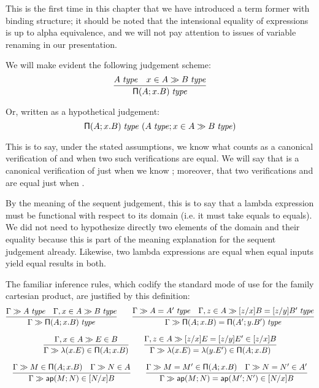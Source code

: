\documentclass[main.tex]{subfiles}
\begin{document}
This is the first time in this chapter that we have introduced a term former
with binding structure; it should be noted that the intensional equality of
expressions is up to alpha equivalence, and we will not pay attention to issues
of variable renaming in our presentation.

We will make evident the following judgement scheme:
\[
  \infer{
    \isset{\typrod{A}{x}{B}}
  }{
    \isset{A} &
    \sequent{\ver{x}{A}}{\isset{B}}
  }
\]

Or, written as a hypothetical judgement:
\[
  \mathsf{\Pi}(A;x.B)\;\mathit{type}\ (A\;\mathit{type};x\in A\gg B\;\mathit{type})
\]

This is to say, under the stated assumptions, we know what counts as a
canonical verification of  and when two such verifications are
equal. We will say that  is a canonical verification of
 just when we know ; moreover,
that two verifications  and  are equal just when
.

By the meaning of the sequent judgement, this is to say that a lambda
expression must be functional with respect to its domain (i.e. it must take
equals to equals). We did not need to hypothesize directly two elements of the
domain and their equality because this is part of the meaning explanation for
the sequent judgement already. Likewise, two lambda expressions are equal when
equal inputs yield equal results in both.

The familiar inference rules, which codify the standard mode of use for the
family cartesian product, are justified by this definition:
\begin{gather*}
  \infer{
    \sequent\Gamma\isset{\typrod{A}{x}{B}}
  }{
    \sequent\Gamma\isset{A} &
    \sequent{\Gamma,\ver{x}{A}}{\isset{B}}
  }\qquad
  \infer{
    \sequent\Gamma\isset{\typrod{A}{x}{B}=\typrod{A'}{y}{B'}}
  }{
   \sequent\Gamma\isset{A=A'} &
    \sequent{\Gamma,\ver{z}{A}}{\isset{[z/x]B=[z/y]B'}}
  }\\[6pt]
  \infer{
    \sequent\Gamma\ver{\lam{x}{E}}{\typrod{A}{x}{B}}
  }{
    \sequent{\Gamma,\ver{x}{A}}{\ver{E}{B}}
  }\qquad
  \infer{
    \sequent\Gamma\ver{\lam{x}{E}=\lam{y}{E'}}{\typrod{A}{x}{B}}
  }{
    \sequent{\Gamma,\ver{z}{A}}{\ver{[z/x]E=[z/y]E'}{[z/x]B}}
  }\\[6pt]
  \infer{
    \sequent\Gamma\ver{\ap{M}{N}}{[N/x]B}
  }{
    \sequent\Gamma\ver{M}{\typrod{A}{x}{B}} &
    \sequent\Gamma\ver{N}{A}
  }\qquad
  \infer{
    \sequent\Gamma\ver{\ap{M}{N}=\ap{M'}{N'}}{[N/x]B}
  }{
    \sequent\Gamma\ver{M=M'}{\typrod{A}{x}{B}} &
    \sequent\Gamma\ver{N=N'}{A'}
  }
\end{gather*}
\end{document}
